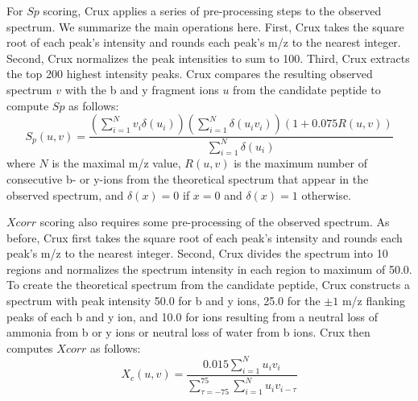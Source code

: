 \documentclass[12pt]{article}
\begin{document}
For $Sp$ scoring, Crux applies a series of pre-processing steps to the
observed spectrum.  We summarize the main operations here.  First,
Crux takes the square root of each peak's intensity and rounds each
peak's m/z to the nearest integer.  Second, Crux normalizes the peak
intensities to sum to 100.  Third, Crux extracts the top 200 highest
intensity peaks.  Crux compares the resulting observed spectrum $v$
with the b and y fragment ions $u$ from the candidate peptide to
compute $Sp$ as follows:
\[
S_p(u, v) = \frac{
\left(\sum_{i=1}^N v_i \delta(u_i) \right)
\left(\sum_{i=1}^N \delta(u_i v_i)\right)
\left(1 + 0.075 R(u, v) \right)
}{\sum_{i=1}^N \delta(u_i)}
\]
where $N$ is the maximal m/z value, $R(u, v)$ is the maximum number of
consecutive b- or y-ions from the theoretical spectrum that appear in
the observed spectrum, and $\delta(x) = 0$ if $x=0$ and $\delta(x) =
1$ otherwise.

$Xcorr$ scoring also requires some pre-processing of the observed
spectrum.  As before, Crux first takes the square root of each peak's
intensity and rounds each peak's m/z to the nearest integer.  Second,
Crux divides the spectrum into 10 regions and normalizes the spectrum
intensity in each region to maximum of 50.0. To create the theoretical
spectrum from the candidate peptide, Crux constructs a spectrum with
peak intensity 50.0 for b and y ions, 25.0 for the $\pm 1$ m/z flanking
peaks of each b and y ion, and 10.0 for ions resulting from a neutral
loss of ammonia from b or y ions or neutral loss of water from b ions.
Crux then computes $Xcorr$ as follows:
\[
X_c(u, v) = \frac{0.015\sum_{i=1}^N u_i v_i}
{\sum_{\tau=-75}^{75} \sum_{i=1}^N u_i v_{i-\tau}}
\]
\end{document}
